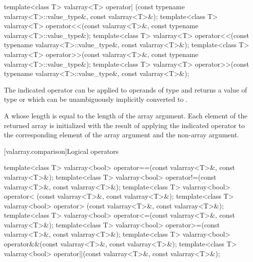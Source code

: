 \begin{itemdecl}
template<class T> valarray<T> operator| (const typename valarray<T>::value_type&,
                                         const valarray<T>&);
template<class T> valarray<T> operator<<(const valarray<T>&,
                                         const typename valarray<T>::value_type&);
template<class T> valarray<T> operator<<(const typename valarray<T>::value_type&,
                                         const valarray<T>&);
template<class T> valarray<T> operator>>(const valarray<T>&,
                                         const typename valarray<T>::value_type&);
template<class T> valarray<T> operator>>(const typename valarray<T>::value_type&,
                                         const valarray<T>&);
\end{itemdecl}

\begin{itemdescr}
\pnum
\mandates
The indicated operator can be applied to operands of type  and returns
a value of type  or which can be unambiguously
implicitly converted to .

\pnum
\returns
A  whose length is equal to the
length of the array argument.
Each element of the returned array is
initialized with the result of applying the indicated operator to the
corresponding element of the array argument and the non-array argument.
\end{itemdescr}

[valarray.comparison]{Logical operators}

%
%
%
%
%
%
%
%
\begin{itemdecl}
template<class T> valarray<bool> operator==(const valarray<T>&, const valarray<T>&);
template<class T> valarray<bool> operator!=(const valarray<T>&, const valarray<T>&);
template<class T> valarray<bool> operator< (const valarray<T>&, const valarray<T>&);
template<class T> valarray<bool> operator> (const valarray<T>&, const valarray<T>&);
template<class T> valarray<bool> operator<=(const valarray<T>&, const valarray<T>&);
template<class T> valarray<bool> operator>=(const valarray<T>&, const valarray<T>&);
template<class T> valarray<bool> operator&&(const valarray<T>&, const valarray<T>&);
template<class T> valarray<bool> operator||(const valarray<T>&, const valarray<T>&);
\end{itemdecl}

